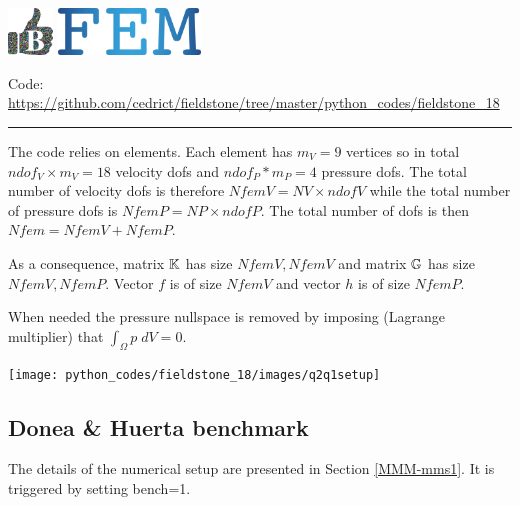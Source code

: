 \includegraphics[height=1.25cm]{images/pictograms/benchmark}
\includegraphics[height=1.25cm]{images/pictograms/FEM}




\begin{center}
\inpython
{\small Code: \url{https://github.com/cedrict/fieldstone/tree/master/python_codes/fieldstone_18}}
\end{center}

\par\noindent\rule{\textwidth}{0.4pt}

The code relies on \QtwoQone elements.
Each element has $m_V=9$ vertices so in total $ndof_V\times m_V=18$ velocity dofs and 
$ndof_P*m_P=4$ pressure dofs. The total number of 
velocity dofs is therefore $NfemV=NV \times ndofV$ while the total number of
pressure dofs is $NfemP=NP\times ndofP$. The total number of dofs is then $Nfem=NfemV+NfemP$.

As a consequence, matrix ${\mathbb{K}}$ has size $NfemV,NfemV$ and matrix ${\mathbb{G}}$ has size $NfemV,NfemP$.
Vector $f$ is of size $NfemV$ and vector $h$ is of size $NfemP$.  

When needed the pressure nullspace is removed 
by imposing (Lagrange multiplier) that $\int_\Omega p \; dV=0$.

\begin{center}
\texttt{[image: python\_codes/fieldstone\_18/images/q2q1setup]}
\end{center}

\subsection*{Donea \& Huerta benchmark}
The details of the numerical setup are presented in Section \ref{MMM-mms1}.
It is triggered by setting {\python bench=1}.

